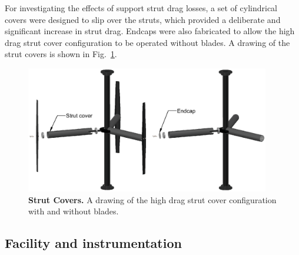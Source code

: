 \documentclass[10pt,letterpaper]{article}
\begin{document}
For investigating the effects of support strut drag losses, a set of cylindrical
covers were designed to slip over the struts, which provided a deliberate and
significant increase in strut drag. Endcaps were also fabricated to allow the
high drag strut cover configuration to be operated without blades. A drawing of
the strut covers is shown in Fig.~\ref{fig:covers}.

\begin{figure}
    \includegraphics[width=0.95\textwidth]{figures/strut_covers.eps}

    \caption{{\bf Strut Covers.} A drawing of the high drag strut cover
        configuration with and without blades.}

    \label{fig:covers}
\end{figure}


\subsection*{Facility and instrumentation}
\end{document}
